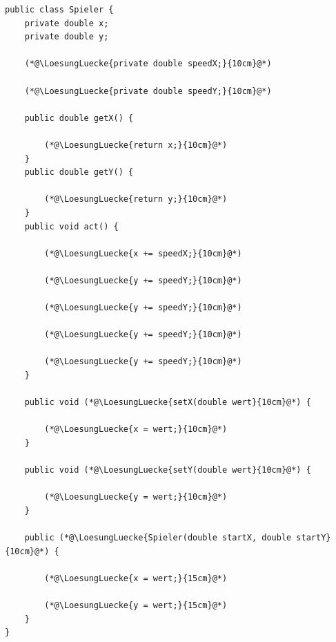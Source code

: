\pagebreak

\large
\begin{lstlisting}
public class Spieler {
    private double x;
    private double y;

    (*@\LoesungLuecke{private double speedX;}{10cm}@*)

    (*@\LoesungLuecke{private double speedY;}{10cm}@*)
    
    public double getX() {
    
        (*@\LoesungLuecke{return x;}{10cm}@*)
    }
    public double getY() {
    
        (*@\LoesungLuecke{return y;}{10cm}@*)
    }
    public void act() {
    
        (*@\LoesungLuecke{x += speedX;}{10cm}@*)
        
        (*@\LoesungLuecke{y += speedY;}{10cm}@*)
        
        (*@\LoesungLuecke{y += speedY;}{10cm}@*)
        
        (*@\LoesungLuecke{y += speedY;}{10cm}@*)
        
        (*@\LoesungLuecke{y += speedY;}{10cm}@*)
    }
    
    public void (*@\LoesungLuecke{setX(double wert}{10cm}@*) {
    
        (*@\LoesungLuecke{x = wert;}{10cm}@*)
    }
    
    public void (*@\LoesungLuecke{setY(double wert}{10cm}@*) {
    
        (*@\LoesungLuecke{y = wert;}{10cm}@*)
    }
    
    public (*@\LoesungLuecke{Spieler(double startX, double startY}{10cm}@*) {
    
        (*@\LoesungLuecke{x = wert;}{15cm}@*)
        
        (*@\LoesungLuecke{y = wert;}{15cm}@*)
    }
}
\end{lstlisting}